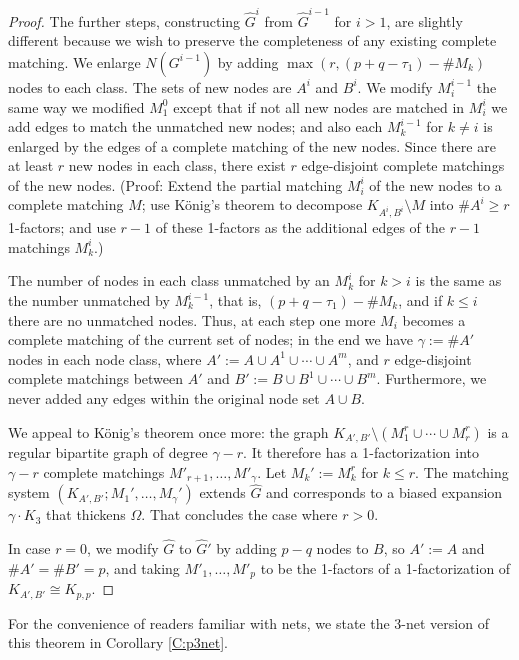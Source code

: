 \documentclass[reqno,12pt]{amsart}
\theoremstyle{remark}
\numberwithin{equation}{section}
\numberwithin{figure}{section}
\begin{document}
\begin{proof}
The further steps, constructing $\hat G^i$ from $\hat G^{i-1}$ for $i>1$, are slightly different because we wish to preserve the completeness of any existing complete matching.  We enlarge $N(G^{i-1})$ by adding $\max(r,(p+q-\tau_1)-\#M_k)$ nodes to each class.  The sets of new nodes are $A^i$ and $B^i$.  We modify $M_i^{i-1}$ the same way we modified $M_1^0$ except that if not all new nodes are matched in $M_i^i$ we add edges to match the unmatched new nodes; and also each $M_k^{i-1}$ for $k \neq i$ is enlarged by the edges of a complete matching of the new nodes.  
Since there are at least $r$ new nodes in each class, there exist $r$ edge-disjoint complete matchings of the new nodes.  (Proof:  Extend the partial matching $M_i^i$ of the new nodes to a complete matching $M$; use K\"onig's theorem to decompose $K_{A^i,B^i}\setminus M$ into $\#A^i \geq r$ 1-factors; and use $r-1$ of these 1-factors as the additional edges of the $r-1$ matchings $M_k^i$.)

The number of nodes in each class unmatched by an $M_k^i$ for $k>i$ is the same as the number unmatched by $M_k^{i-1}$, that is, $(p+q-\tau_1)-\#M_k$, and if $k \leq i$ there are no unmatched nodes.
Thus, at each step one more $M_i$ becomes a complete matching of the current set of nodes; in the end we have $\gamma:=\#A'$ nodes in each node class, where $A' := A \cup A^1 \cup \cdots \cup A^m$, and $r$ edge-disjoint complete matchings between $A'$ and $B' := B \cup B^1 \cup \cdots \cup B^m$.  Furthermore, we never added any edges within the original node set $A \cup B$.

We appeal to K\"onig's theorem once more: the graph $K_{A',B'} \setminus (M_1^r \cup \cdots \cup M_r^r)$ is a regular bipartite graph of degree $\gamma-r$.  It therefore has a 1-factorization into $\gamma-r$ complete matchings $M'_{r+1},\ldots,M'_{\gamma}$.  Let $M_k':=M_k^r$ for $k \leq r$.  The matching system $(K_{A',B'}; M_1',\ldots,M_\gamma')$ extends $\hat G$ and corresponds to a biased expansion $\gamma\cdot K_3$ that thickens $\Omega$.  That concludes the case where $r>0$.

In case $r=0$, we modify $\hat G$ to $\hat G'$ by adding $p-q$ nodes to $B$, so $A':=A$ and $\#A'=\#B'=p$, and taking $M'_1,\ldots,M'_p$ to be the 1-factors of a 1-factorization of $K_{A',B'} \cong K_{p,p}$.
\end{proof}

For the convenience of readers familiar with nets, we state the $3$-net version of this theorem in Corollary \ref{C:p3net}.
\end{document}
